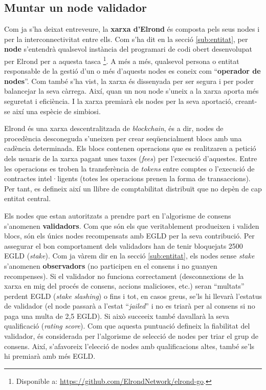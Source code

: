 \documentclass[11pt,a4paper]{article}
\begin{document}
\subsection{Muntar un node validador}
Com ja s'ha deixat entreveure, la \textbf{xarxa d'Elrond} és composta pels seus nodes i per la interconnectivitat entre ells. Com s'ha dit en la secció \ref{sub:entitat}, per \textbf{node} s'entendrà qualsevol instància del programari de codi obert desenvolupat per Elrond per a aquesta tasca \footnote{Disponible a: \url{https://github.com/ElrondNetwork/elrond-go}.}. A més a més, qualsevol persona o entitat responsable de la gestió d'un o més d'aquests nodes es coneix com ``\textbf{operador de nodes}''. Com també s'ha vist, la xarxa és dissenyada per ser segura i per poder balancejar la seva càrrega. Així, quan un nou node s'uneix a la xarxa aporta més seguretat i eficiència. I la xarxa premiarà els nodes per la seva aportació, creant-se així una espècie de simbiosi.

Elrond és una xarxa descentralitzada de \textit{blockchain}, és a dir, nodes de procedència desconeguda s'uneixen per crear seqüencialment blocs amb una cadència determinada. Els blocs contenen operacions que es realitzaren a petició dels usuaris de la xarxa pagant unes taxes (\textit{fees}) per l'execució d'aquestes. Entre les operacions es troben la transferència de \textit{tokens} entre comptes o l'execució de contractes intel·ligents (totes les operacions prenen la forma de transaccions). Per tant, es defineix així un llibre de comptabilitat distribuït que no depèn de cap entitat central. 

Els nodes que estan autoritzats a prendre part en l'algorisme de consens s'anomenen \textbf{validadors}. Com que són els que veritablement produeixen i validen blocs, són els únics nodes recompensats amb EGLD per la seva contribució. Per assegurar el bon comportament dels validadors han de tenir bloquejats 2500 EGLD (\textit{stake}). Com ja vàrem dir en la secció \ref{sub:entitat}, els nodes sense \textit{stake} s'anomenen \textbf{observadors} (no participen en el consens i no guanyen recompenses). Si el validador no funciona correctament (desconnexions de la xarxa en mig del procés de consens, accions malicioses, etc.) seran ``multats'' perdent EGLD (\textit{stake slashing}) o fins i tot, en casos greus, se'ls hi llevarà l'estatus de validador (el node passarà a l'estat ``\textit{jailed}'' i no es triarà per al consens si no paga una multa de 2,5 EGLD).  Si això succeeix també davallarà la seva qualificació (\textit{rating score}). Com que aquesta puntuació defineix la fiabilitat del validador, és considerada per l'algorisme de selecció de nodes per triar el grup de consens. Així, s'afavoreix l'elecció de nodes amb qualificacions altes, també se'ls hi premiarà amb més EGLD. 
\end{document}
